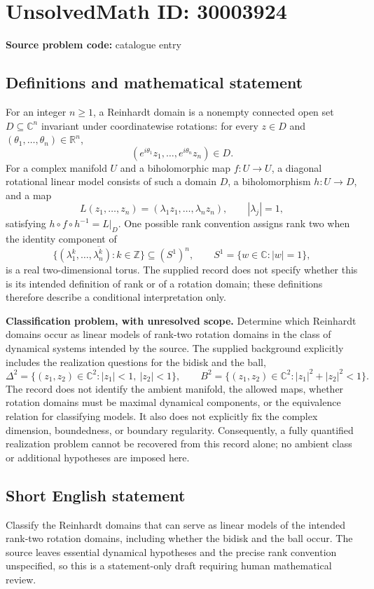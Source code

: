 \documentclass[11pt]{article}
\newcommand{\Z}{\mathbb{Z}}
\newcommand{\R}{\mathbb{R}}
\newcommand{\C}{\mathbb{C}}
\begin{document}
\section*{UnsolvedMath ID: 30003924}
\textbf{Source problem code:} catalogue entry
\subsection{Definitions and mathematical statement}
For an integer \(n\geq 1\), a Reinhardt domain is a nonempty connected open set \(D\subseteq\C^n\) invariant under coordinatewise rotations: for every \(z\in D\) and \((\theta_1,\ldots,\theta_n)\in\R^n\),
\[
(e^{i\theta_1}z_1,\ldots,e^{i\theta_n}z_n)\in D.
\]
For a complex manifold \(U\) and a biholomorphic map \(f:U\to U\), a diagonal rotational linear model consists of such a domain \(D\), a biholomorphism \(h:U\to D\), and a map
\[
L(z_1,\ldots,z_n)=(\lambda_1z_1,\ldots,\lambda_nz_n),\qquad |\lambda_j|=1,
\]
satisfying \(h\circ f\circ h^{-1}=L|_D\). One possible rank convention assigns rank two when the identity component of
\[
\overline{\{(\lambda_1^k,\ldots,\lambda_n^k):k\in\Z\}}\subseteq(S^1)^n,
\qquad S^1=\{w\in\C:|w|=1\},
\]
is a real two-dimensional torus. The supplied record does not specify whether this is its intended definition of rank or of a rotation domain; these definitions therefore describe a conditional interpretation only.

\textbf{Classification problem, with unresolved scope.} Determine which Reinhardt domains occur as linear models of rank-two rotation domains in the class of dynamical systems intended by the source. The supplied background explicitly includes the realization questions for the bidisk and the ball,
\[
\Delta^2=\{(z_1,z_2)\in\C^2:|z_1|<1,\ |z_2|<1\},\qquad
B^2=\{(z_1,z_2)\in\C^2:|z_1|^2+|z_2|^2<1\}.
\]
The record does not identify the ambient manifold, the allowed maps, whether rotation domains must be maximal dynamical components, or the equivalence relation for classifying models. It also does not explicitly fix the complex dimension, boundedness, or boundary regularity. Consequently, a fully quantified realization problem cannot be recovered from this record alone; no ambient class or additional hypotheses are imposed here.
\subsection{Short English statement}
Classify the Reinhardt domains that can serve as linear models of the intended rank-two rotation domains, including whether the bidisk and the ball occur. The source leaves essential dynamical hypotheses and the precise rank convention unspecified, so this is a statement-only draft requiring human mathematical review.
\end{document}
